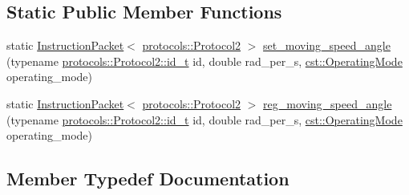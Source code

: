 \subsection*{Static Public Member Functions}
\begin{DoxyCompactItemize}
\item 
static \hyperlink{classdynamixel_1_1_instruction_packet}{Instruction\+Packet}$<$ \hyperlink{classdynamixel_1_1protocols_1_1_protocol2}{protocols\+::\+Protocol2} $>$ \hyperlink{classdynamixel_1_1servos_1_1_protocol_specific_packets_3_01_m_00_01protocols_1_1_protocol2_01_4_a366ea0ab92847a3cbacdb398934cabbb}{set\+\_\+moving\+\_\+speed\+\_\+angle} (typename \hyperlink{classdynamixel_1_1protocols_1_1_protocol2_a38d9cae72cd86213cca74e718c240429}{protocols\+::\+Protocol2\+::id\+\_\+t} id, double rad\+\_\+per\+\_\+s, \hyperlink{namespacedynamixel_1_1servos_1_1cst_ac17b5608f65c6495114d34f8efc4d809}{cst\+::\+Operating\+Mode} operating\+\_\+mode)
\item 
static \hyperlink{classdynamixel_1_1_instruction_packet}{Instruction\+Packet}$<$ \hyperlink{classdynamixel_1_1protocols_1_1_protocol2}{protocols\+::\+Protocol2} $>$ \hyperlink{classdynamixel_1_1servos_1_1_protocol_specific_packets_3_01_m_00_01protocols_1_1_protocol2_01_4_a3dcf288a975f802ad748220e5e6ae52f}{reg\+\_\+moving\+\_\+speed\+\_\+angle} (typename \hyperlink{classdynamixel_1_1protocols_1_1_protocol2_a38d9cae72cd86213cca74e718c240429}{protocols\+::\+Protocol2\+::id\+\_\+t} id, double rad\+\_\+per\+\_\+s, \hyperlink{namespacedynamixel_1_1servos_1_1cst_ac17b5608f65c6495114d34f8efc4d809}{cst\+::\+Operating\+Mode} operating\+\_\+mode)
\end{DoxyCompactItemize}


\subsection{Member Typedef Documentation}
\hypertarget{classdynamixel_1_1servos_1_1_protocol_specific_packets_3_01_m_00_01protocols_1_1_protocol2_01_4_a145dc648f17fe5d401b917095a28e13f}{}
